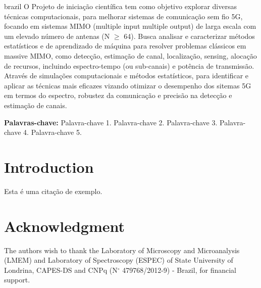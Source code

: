 \documentclass[article,10pt,twoside,a4paper,twocolumn,english,brazil]{abntex2}
\begin{document}
\renewcommand{\resumoname}{\texorpdfstring{\fontsize{14pt}{16.8pt} \fontfamily{ptm} \selectfont \textbf{Resumo} \\[-0.3cm] \rule{0.91\textwidth}{0.5pt} \vspace{-0.5cm}}{Resumo}}
\begin{resumoumacoluna}
    \normalsize
    \begin{otherlanguage*}{brazil}
	O Projeto de iniciação científica tem como objetivo explorar diversas técnicas computacionais, para melhorar sistemas de comunicação sem fio 5G, focando em sistemas MIMO (multiple input multiple output) de larga escala com um elevado número de antenas (N $\geq$ 64). Busca analisar e caracterizar métodos estatísticos e de aprendizado de máquina para resolver problemas clássicos em massive MIMO, como detecção, estimação de canal, localização, sensing, alocação de recursos, incluindo espectro-tempo (ou sub-canais) e potência de transmissão. Através de simulações computacionais e métodos estatísticos, para identificar e aplicar as técnicas mais eficazes vizando otimizar o desempenho dos sitemas 5G em termos  do espectro, robustez da comunicação e precisão na detecção e estimação de canais.
         
				\vspace{0.15cm}
        \noindent \textbf{Palavras-chave:} Palavra-chave 1. Palavra-chave 2. Palavra-chave  3. Palavra-chave  4. Palavra-chave  5.
	
     
    \end{otherlanguage*}
\end{resumoumacoluna}
\vspace{0.3cm}


\textual
\OnehalfSpacing
\twocolumn
\pagestyle{text}

\section*{Introduction}

Esta é uma citação de exemplo.


\postextual
\pagestyle{text}

\section*{Acknowledgment}
 The authors wish to thank the Laboratory of Microscopy and Microanalysis (LMEM) and Laboratory of Spectroscopy (ESPEC) of State University of Londrina, CAPES-DS and CNPq (N$^{\circ}$ 479768/2012-9) - Brazil, for financial support.
\end{document}
